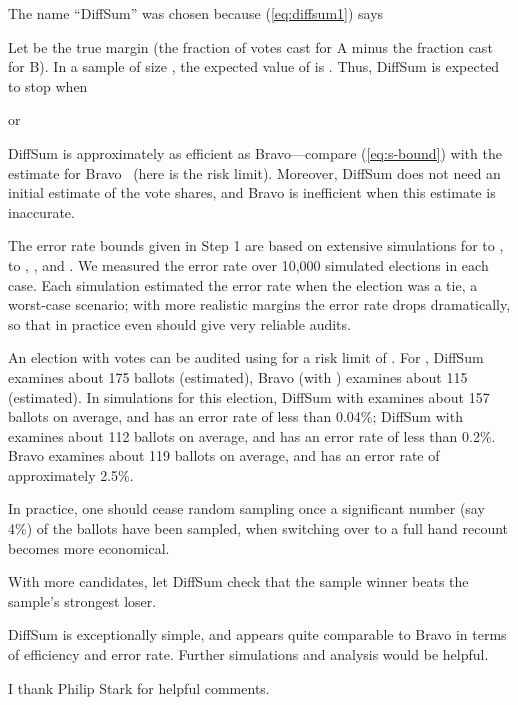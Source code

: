 \documentclass[twocolumn]{article}
\begin{document}
The name ``{\sc DiffSum}'' was chosen because
(\ref{eq:diffsum1}) says


 Let  be the true margin (the
fraction of votes cast for A minus the fraction cast for B).
In a sample of size ,
the expected value of  is .  Thus, {\sc DiffSum} is expected to
stop when

or


{\sc DiffSum} is approximately as efficient as {\sc Bravo}---compare
(\ref{eq:s-bound}) with the estimate  for {\sc
  Bravo}~\cite{LindemanStYa12} (here  is the risk limit).
Moreover, {\sc DiffSum} does not need an initial estimate of the vote
shares, and {\sc Bravo} is inefficient when this estimate is
inaccurate.

The error rate bounds given in Step 1 are based on
extensive simulations for 
 to , 
 to ,
, and . 
We measured the error rate over 10,000 simulated elections
in each case.
Each simulation estimated the error rate when the election was
a tie, a worst-case scenario;
with more realistic margins the error
rate drops dramatically, so that in practice
even  should give very reliable audits.

\smallskip
{} 
An election with  votes can be audited using  for 
a risk limit
of .
For , {\sc DiffSum} examines about 175 ballots (estimated),
{\sc Bravo} (with ) examines about 115 (estimated).
In simulations for this election,
{\sc DiffSum} with 
examines about 157 ballots on average, and has an error rate of less than 0.04\%;  
{\sc DiffSum} with 
examines about 112 ballots on average, and has an error rate of less than 0.2\%.
Bravo examines about 119 ballots on average, and has an error rate of approximately 2.5\%.

\smallskip
{}
In practice, one should cease random sampling once a significant
number (say 4\%) of the ballots have been sampled, when switching over
to a full hand recount becomes more economical.

With more candidates, let {\sc DiffSum} check that the
sample winner beats the sample's strongest loser.

\smallskip
{}
{\sc DiffSum} is exceptionally simple, and 
appears quite comparable to {\sc Bravo}
in terms of efficiency and error rate.  Further simulations and
analysis would be helpful.

\smallskip
{} I thank Philip Stark for helpful comments.

\small
\vspace*{-0.2in}


\end{document}
